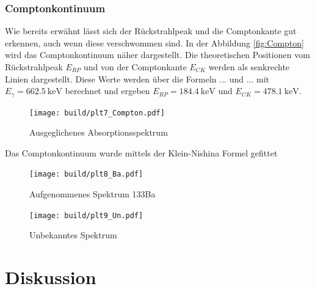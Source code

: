 \subsubsection{Comptonkontinuum}
Wie bereits erwähnt lässt sich der Rückstrahlpeak und die Comptonkante gut
erkennen, auch wenn diese verschwommen sind. In der Abbildung
\eqref{fig:Compton} wird das Comptonkontinuum näher dargestellt. Die
theoretischen Positionen vom Rückstrahlpeak $E_{RP}$ und von der Comptonkante
$E_{CK}$ werden als senkrechte Linien dargestellt. Diese Werte werden über die
Formeln ... und ... mit $E_{\gamma}=\qty{662.5}{\kilo\eV}$ berechnet und
ergeben $E_{RP}=\qty{184.4}{\kilo\eV}$ und $E_{CK}=\qty{478.1}{\kilo\eV}$.

\begin{figure}[H]
	\centering
	\texttt{[image: build/plt7\_Compton.pdf]}
	\caption{Ausgeglichenes Absorptionsspektrum}
	\label{fig:Compton}
\end{figure}

Das Comptonkontinuum wurde mittels der Klein-Nishina Formel gefittet

\begin{figure}
	\centering
	\texttt{[image: build/plt8\_Ba.pdf]}
	\caption{Aufgenommenes Spektrum 133Ba}
	\label{fig:Ba_spektrum}
\end{figure}

\begin{figure}
	\centering
	\texttt{[image: build/plt9\_Un.pdf]}
	\caption{Unbekanntes Spektrum}
	\label{fig:Un_spektrum}
\end{figure}


\section{Diskussion}

\newpage
\printbibliography

